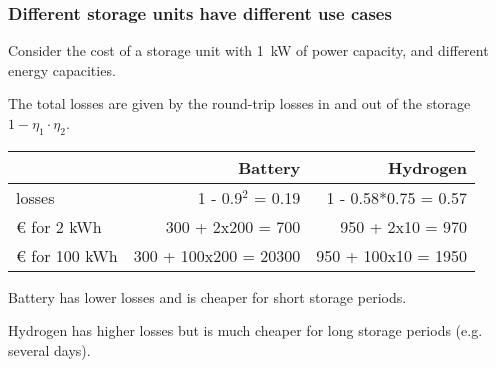 \documentclass[10pt,aspectratio=169,dvipsnames]{beamer}
\newcommand{\ra}[1]{\renewcommand{\arraystretch}{#1}}
\begin{document}
\begin{frame}
  \frametitle{Different storage units have different use cases}

  Consider the cost of a storage unit with 1~kW of power capacity, and different energy capacities.

  The total losses are given by the \alert{round-trip losses} in and
  out of the storage $1- \eta_1\cdot \eta_2$.

  \ra{1.05}
  \begin{table}[!t]
    \begin{tabular}{lrr}
      \toprule
      & Battery & Hydrogen \\
      \midrule
      losses & 1 - 0.9$^2$ = 0.19 & 1 - 0.58*0.75 = 0.57 \\
      \euro{} for 2 kWh & 300 + 2x200 = 700 & 950 + 2x10 = 970 \\
      \euro{} for 100 kWh & 300 + 100x200 = 20300 & 950 + 100x10 = 1950 \\
      \bottomrule
    \end{tabular}
  \end{table}

  Battery has lower losses and is cheaper for short storage periods.

  Hydrogen has higher losses but is much cheaper for long storage periods (e.g. several days).
\end{frame}
\end{document}

